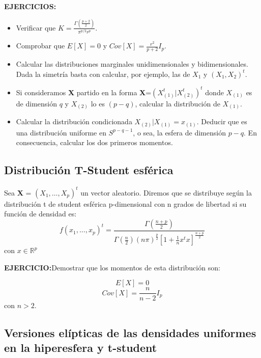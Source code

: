 \documentclass{article}
\theoremstyle{theorem-style}  %
\theoremstyle{definition}
\theoremstyle{example-style}
\begin{document}
	\textbf{EJERCICIOS:}
	\begin{itemize}
		\item Verificar que $K = \frac{\Gamma(\frac{p+2}{2})}{\pi ^ {p/2} r^p}$.
		
		\item Comprobar que $E[X]=0$ y $Cov[X]=\frac{r^2}{p+2}I_p$.
		
		\item Calcular las distribuciones marginales unidimensionales y bidimensionales. Dada la simetría basta con calcular, por ejemplo, las de $X_1$ y $(X_1,X_2)^t$.
		
		\item Si consideramos \textbf{X} partido en la forma \textbf{X}=$(X^t_{(1)}|X^t_{(2)})^t$ donde $X_{(1)}$ es de dimensión $q$ y $X_{(2)}$ lo es $(p-q)$, calcular la distribución de $X_{(1)}$.
		
		\item Calcular la distribución condicionada $X_{(2)}|X_{(1)} = x_{(1)}$. Deducir que es una distribución uniforme en $S^{p-q-1}$, o sea, la esfera de dimensión $p-q$. En consecuencia, calcular los dos primeros momentos.
	\end{itemize}
	
	\subsection{Distribución T-Student esférica}
	
	Sea \textbf{X} = $(X_1, \dots , X_p)^t$ un vector aleatorio. Diremos que se distribuye según la distribución t de student esférica p-dimensional con n grados de libertad si su función de densidad es:
	$$ f(x_1, \dots, x_p)^t = \frac{\Gamma(\frac{n+p}{2})}{\Gamma(\frac{n}{2})(n \pi )^{\frac{p}{2}}[1+\frac{1}{n}x^tx]^{\frac{n+p}{2}}} $$ con $x \in \mathbb{R}^p$
	
	\textbf{EJERCICIO:}Demostrar que los momentos de esta distribución son:
	
	$$ E[X]=0$$ $$ Cov[X]= \frac{n}{n-2}I_{p}$$ con $n>2$. 
	
	\subsection{Versiones elípticas de las densidades uniformes en la hiperesfera y t-student}
	
\end{document}
